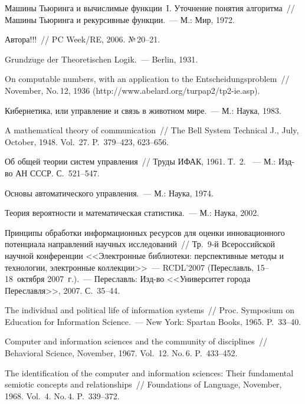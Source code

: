 \begin{multicols}{2}
{{\begin{thebibliography}{99}
     Машины Тьюринга и вычислимые функции~I. Уточнение понятия алгоритма~// Машины
Тьюринга и рекурсивные функции.~--- М.: Мир, 1972.

      Автора!!!~// PC Week/RE, 2006. №\,20--21.

     Grundz$\ddot{\mbox{u}}$ge der Theoretischen Logik.~--- Berlin, 1931.

     On computable numbers, with an application to the Entscheidungsproblem~// November,
No.\,12, 1936  ({\sf http://www.abelard.org/turpap2/tp2-ie.asp}).

     Кибернетика, или управление и связь в животном мире.~--- М.: Наука, 1983.

     A mathematical theory of communication~// The Bell System Technical J., July, October, 1948.
Vol.~27. P.~379--423, 623--656.

     Об общей теории систем управления~// Труды ИФАК, 1961. Т.~2. ~--- М.: Изд-во АН
СССР.  С.~521--547.

     Основы автоматического управления.~--- М.: Наука, 1974.

     Теория вероятности и математическая статистика.~--- М.: Наука, 2002.

     Принципы обработки информационных ресурсов для оценки ин\-но\-ваци\-он\-но\-го потенциала
направлений научных исследований~// Тр.\ 9-й Всероссийской научной конференции
<<Электронные библиотеки: перспективные методы и технологии, электронные
     коллекции>>~--- RCDL'2007 (Переславль, 15--18~октября 2007~г.).~--- Переславль:
     Изд-во <<Университет города Пе\-ре\-слав\-ля>>, 2007. С.~35--44.

     The individual and political life of information systems~// Proc. Symposium on Education for
Information Science.~--- New York: Spartan Books, 1965. P.~33--40.

     Computer and information sciences and the community of disciplines~// Behavioral Science,
November, 1967. Vol.~12. No.\,6. P.~433--452.

     The identification of the computer and information sciences: Their fundamental semiotic concepts
and relationships~// Foundations of Language, November, 1968. Vol.~4. No.\,4. P.~339--372.


\end{thebibliography}}}
\end{multicols}
